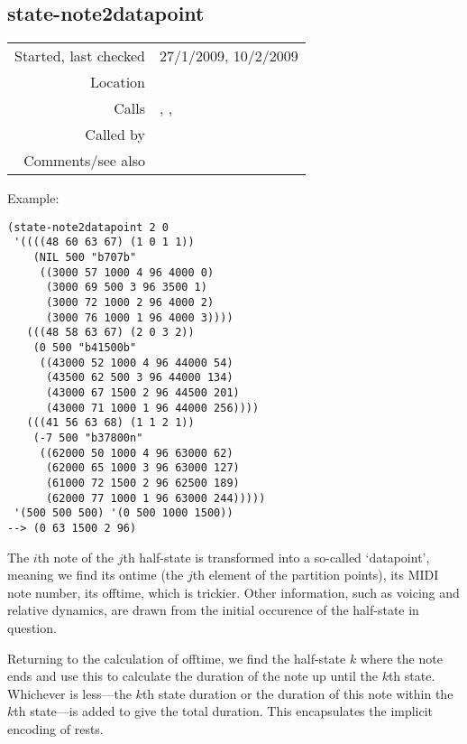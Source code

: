 \subsection*{state-note2datapoint}\label{fun:state-note2datapoint}

\vspace{0.3cm}
\begin{tabular}{r|p{8cm}}
Started, last checked & 27/1/2009, 10/2/2009 \\
Location & \nameref{sec:markov-compose} \\
Calls & \nameref{fun:index-item-1st-occurs}, \nameref{fun:index-of-offtime},\newline \nameref{fun:min-item} \\
Called by & \nameref{fun:half-state2datapoints} \\
Comments/see also & \nameref{fun:state-note2datapoint-by-lookup}
\end{tabular}

\vspace{0.5cm}
\noindent Example:
\begin{verbatim}
(state-note2datapoint 2 0
 '((((48 60 63 67) (1 0 1 1))
    (NIL 500 "b707b"
     ((3000 57 1000 4 96 4000 0)
      (3000 69 500 3 96 3500 1)
      (3000 72 1000 2 96 4000 2)
      (3000 76 1000 1 96 4000 3))))
   (((48 58 63 67) (2 0 3 2))
    (0 500 "b41500b"
     ((43000 52 1000 4 96 44000 54)
      (43500 62 500 3 96 44000 134)
      (43000 67 1500 2 96 44500 201)
      (43000 71 1000 1 96 44000 256))))
   (((41 56 63 68) (1 1 2 1))
    (-7 500 "b37800n"
     ((62000 50 1000 4 96 63000 62)
      (62000 65 1000 3 96 63000 127)
      (61000 72 1500 2 96 62500 189)
      (62000 77 1000 1 96 63000 244)))))
 '(500 500 500) '(0 500 1000 1500))
--> (0 63 1500 2 96)
\end{verbatim}

\noindent The $i$th note of the $j$th half-state is
transformed into a so-called `datapoint', meaning we
find its ontime (the $j$th element of the partition
points), its MIDI note number, its offtime, which is
trickier. Other information, such as voicing and
relative dynamics, are drawn from the initial
occurence of the half-state in question.

Returning to the calculation of offtime, we find the
half-state $k$ where the note ends and use this to
calculate the duration of the note up until the $k$th
state. Whichever is less---the $k$th state duration or
the duration of this note within the $k$th state---is
added to give the total duration. This encapsulates
the implicit encoding of rests.


